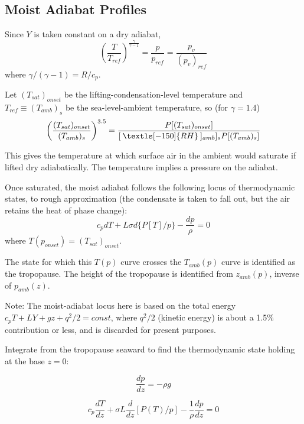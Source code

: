 \documentclass[preprint, prX]{revtex4}
\newcommand{\pfrac}[2]{\left(\frac{#1}{#2}\right)}
\newcommand{\dd}[2]{\frac{d#1}{d#2}}
\newcommand{\gogmo}{\frac{\gamma}{\gamma-1}}
\newcommand{\vgogmo}{\gamma/(\gamma-1)}
\newcommand{\rh}{\:\textls[-150]{RH}\:}
\begin{document}
\subsection{Moist Adiabat Profiles}

Since $Y$ is taken constant on a dry adiabat,   
\begin{equation}
	 \pfrac{T}{T_{ref}}^\gogmo = \frac{p}{p_{ref}} = \frac{p_v}{(p_v)_{ref}}
\end{equation}
where $\vgogmo = R/c_p$.

Let $(T_{sat})_{onset}$ be the lifting-condensation-level temperature and $T_{ref} \equiv (T_{amb})_s$ be the sea-level-ambient temperature, so (for $\gamma=1.4$)
\begin{equation}
	 \pfrac{ (T_{sat} )_{onset}  }{ (T_{amb})_s } ^{3.5} = \frac{ P[ (T_{sat})_{onset}]   }{[\rh]_{amb}]_s P[(T_{amb})_s]}
\end{equation}


This gives the temperature at which surface air in the ambient would saturate if lifted dry adiabatically. The temperature implies a pressure on the adiabat.

Once saturated, the moist adiabat follows the following locus of thermodynamic states, to rough approximation (the condensate is taken to fall out, but the air retains the heat of phase change):
\begin{equation}
	c_p dT + L \sigma d\{ P[T]/p \} - \frac{dp}{\rho} = 0
\end{equation}
where $T(p_{onset} ) = (T_{sat} )_{onset}$.

The state for which this $T(p)$ curve crosses the $T_{amb}(p)$ curve is identified as the tropopause. The height of the tropopause is identified from $z_{amb}(p)$, inverse of $p_{amb}(z)$.

Note: The moist-adiabat locus here is based on the total energy $c_p T + L Y + gz + q^2/2 = const$, where $q^2/2$ (kinetic energy) is about a 1.5\% contribution or less, and is discarded for present purposes.

Integrate from the tropopause seaward to find the thermodynamic state holding at the base $z=0$:

\begin{equation}
	\frac{dp}{dz} = - \rho g
\end{equation}

\begin{equation}
	c_p \dd{T}{z} + \sigma L \dd{}{z} [ P(T) / p] - \frac{1}{\rho} \dd{p}{z} = 0
\end{equation}
\end{document}
